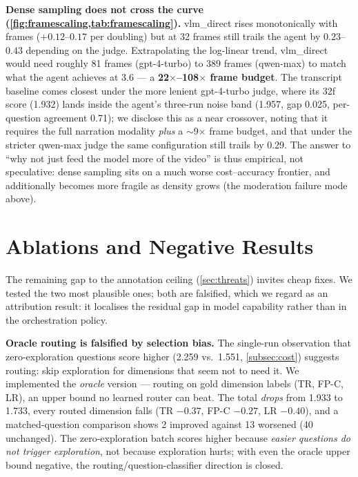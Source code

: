 \textbf{Dense sampling does not cross the curve
(\cref{fig:framescaling,tab:framescaling}).} vlm\_direct rises monotonically with
frames ($+0.12$--$0.17$ per doubling) but at 32 frames still trails the agent by
$0.23$--$0.43$ depending on the judge. Extrapolating the log-linear trend,
vlm\_direct would need roughly 81 frames (gpt-4-turbo) to 389 frames (qwen-max) to
match what the agent achieves at 3.6 --- a \textbf{22$\times$--108$\times$ frame
budget}. The transcript baseline comes closest under the more lenient gpt-4-turbo
judge, where its 32f score (1.932) lands inside the agent's three-run noise band
(1.957, gap 0.025, per-question agreement 0.71); we disclose this as a near
crossover, noting that it requires the full narration modality \emph{plus} a
$\sim$9$\times$ frame budget, and that under the stricter qwen-max judge the same
configuration still trails by 0.29. The answer to ``why not just feed the model
more of the video'' is thus empirical, not speculative: dense sampling sits on a
much worse cost--accuracy frontier, and additionally becomes more fragile as
density grows (the moderation failure mode above).

\section{Ablations and Negative Results}
\label{sec:negative}

The remaining gap to the annotation ceiling (\cref{sec:threats}) invites cheap
fixes. We tested the two most plausible ones; both are falsified, which we regard
as an attribution result: it localises the residual gap in model capability rather
than in the orchestration policy.

\textbf{Oracle routing is falsified by selection bias.} The single-run observation
that zero-exploration questions score higher (2.259 vs.\ 1.551,
\cref{subsec:cost}) suggests routing: skip exploration for dimensions that seem
not to need it. We implemented the \emph{oracle} version --- routing on gold
dimension labels (TR, FP-C, LR), an upper bound no learned router can beat. The
total \emph{drops} from 1.933 to 1.733, every routed dimension falls
(TR $-0.37$, FP-C $-0.27$, LR $-0.40$), and a matched-question comparison shows 2
improved against 13 worsened (40 unchanged). The zero-exploration batch scores
higher because \emph{easier questions do not trigger exploration}, not because
exploration hurts; with even the oracle upper bound negative, the
routing/question-classifier direction is closed.

